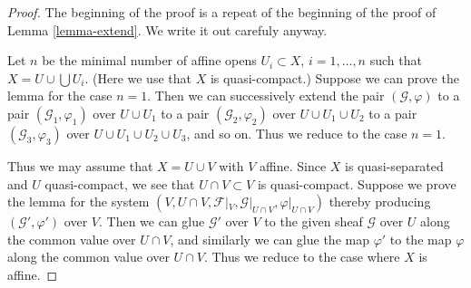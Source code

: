 \begin{proof}
The beginning of the proof is a repeat of the beginning of the
proof of Lemma \ref{lemma-extend}. We write it out carefuly anyway.

\medskip\noindent
Let $n$ be the minimal number of affine opens $U_i \subset X$,
$i = 1, \ldots , n$ such that $X = U \cup \bigcup U_i$.
(Here we use that $X$ is quasi-compact.) Suppose
we can prove the lemma for the case $n = 1$. Then we can successively
extend the pair $(\mathcal{G}, \varphi)$
to a pair $(\mathcal{G}_1, \varphi_1)$ over $U \cup U_1$
to a pair $(\mathcal{G}_2, \varphi_2)$ over $U \cup U_1 \cup U_2$
to a pair $(\mathcal{G}_3, \varphi_3)$ over $U \cup U_1 \cup U_2 \cup U_3$,
and so on.
Thus we reduce to the case $n = 1$.

\medskip\noindent
Thus we may assume that $X = U \cup V$ with $V$ affine.
Since $X$ is quasi-separated and $U$ quasi-compact,
we see that $U \cap V \subset V$ is quasi-compact.
Suppose we prove the lemma for the system
$(V, U \cap V, \mathcal{F}|_V, \mathcal{G}|_{U \cap V}, \varphi|_{U \cap V})$
thereby producing $(\mathcal{G}', \varphi')$ over $V$.
Then we can glue $\mathcal{G}'$ over $V$ to the given sheaf $\mathcal{G}$
over $U$ along the common value over $U \cap V$, and similarly we can glue
the map $\varphi'$ to the map $\varphi$ along the common value over
$U \cap V$. Thus we reduce to the case where $X$ is affine.


\end{proof}
